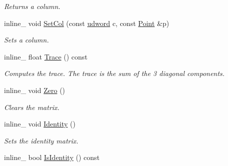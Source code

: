 \begin{DoxyCompactItemize}
\begin{DoxyCompactList}\small\item\em Returns a column. \end{DoxyCompactList}\item 
\hypertarget{class_matrix3x3_a806c9df77cbf6626a60be2850b1626fc}{inline\+\_\+ void \hyperlink{class_matrix3x3_a806c9df77cbf6626a60be2850b1626fc}{Set\+Col} (const \hyperlink{_ice_types_8h_a44c6f1920ba5551225fb534f9d1a1733}{udword} c, const \hyperlink{class_point}{Point} \&p)}\label{class_matrix3x3_a806c9df77cbf6626a60be2850b1626fc}

\begin{DoxyCompactList}\small\item\em Sets a column. \end{DoxyCompactList}\item 
\hypertarget{class_matrix3x3_a45d850d0a4804a6d5de1aee1597e2001}{inline\+\_\+ float \hyperlink{class_matrix3x3_a45d850d0a4804a6d5de1aee1597e2001}{Trace} () const }\label{class_matrix3x3_a45d850d0a4804a6d5de1aee1597e2001}

\begin{DoxyCompactList}\small\item\em Computes the trace. The trace is the sum of the 3 diagonal components. \end{DoxyCompactList}\item 
\hypertarget{class_matrix3x3_a7d8c601a1aeb4f89cc51f54c9c5454f7}{inline\+\_\+ void \hyperlink{class_matrix3x3_a7d8c601a1aeb4f89cc51f54c9c5454f7}{Zero} ()}\label{class_matrix3x3_a7d8c601a1aeb4f89cc51f54c9c5454f7}

\begin{DoxyCompactList}\small\item\em Clears the matrix. \end{DoxyCompactList}\item 
\hypertarget{class_matrix3x3_adc929f7f8eee58f37fbc29f3eefe3a08}{inline\+\_\+ void \hyperlink{class_matrix3x3_adc929f7f8eee58f37fbc29f3eefe3a08}{Identity} ()}\label{class_matrix3x3_adc929f7f8eee58f37fbc29f3eefe3a08}

\begin{DoxyCompactList}\small\item\em Sets the identity matrix. \end{DoxyCompactList}\item 
\hypertarget{class_matrix3x3_a0ecdee706e3a985063e3b372da19fbbc}{inline\+\_\+ bool \hyperlink{class_matrix3x3_a0ecdee706e3a985063e3b372da19fbbc}{Is\+Identity} () const }\label{class_matrix3x3_a0ecdee706e3a985063e3b372da19fbbc}


\end{DoxyCompactItemize}
